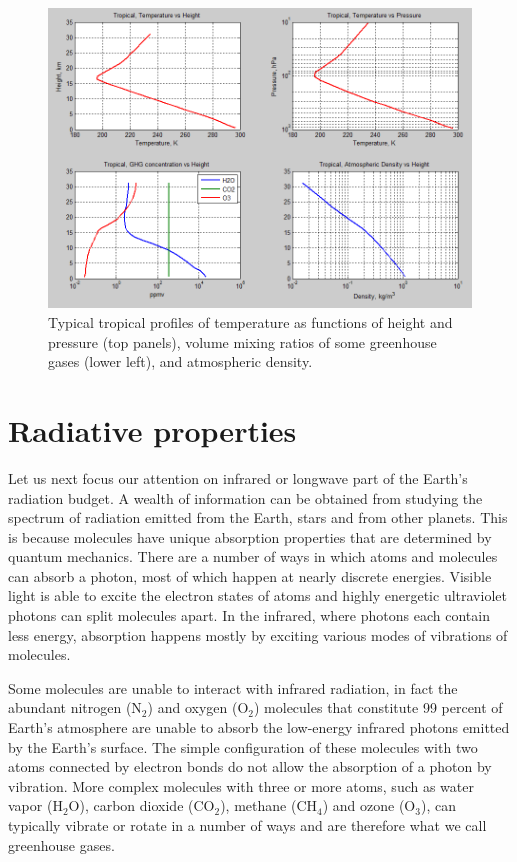 \documentclass[12pt]{book}
\begin{document}
\begin{figure}
\begin{center}
\includegraphics[width=17 cm]{../external_figures/atmospheric-radiation-13a-tropical-profile-temperature-gases-density}
\end{center}
\caption{ Typical tropical profiles of temperature as functions of height and pressure (top panels), volume mixing ratios of some greenhouse gases (lower left), and atmospheric density.  } 
\label{fig:tropical_profiles}
\end{figure}

\section{Radiative properties}
Let us next focus our attention on infrared or longwave part of the Earth's radiation budget. A wealth of information can be obtained from studying the spectrum of radiation emitted from the Earth, stars and from other planets. This is because molecules have unique absorption properties that are determined by quantum mechanics. There are a number of ways in which atoms and molecules can absorb a photon, most of which happen at nearly discrete energies. Visible light is able to excite the electron states of atoms and highly energetic ultraviolet photons can split molecules apart. In the infrared, where photons each contain less energy, absorption happens mostly by exciting various modes of vibrations of molecules. 

Some molecules are unable to interact with infrared radiation, in fact the abundant nitrogen (N$_2$) and oxygen (O$_2$) molecules that constitute 99 percent of Earth's atmosphere are unable to absorb the low-energy infrared photons emitted by the Earth's surface. The simple configuration of these molecules with two atoms connected by electron bonds do not allow the absorption of a photon by vibration. More complex molecules with three or more atoms, such as water vapor (H$_2$O), carbon dioxide (CO$_2$), methane (CH$_4$) and ozone (O$_3$), can typically vibrate or rotate in a number of ways and are therefore what we call greenhouse gases. 
\end{document}
